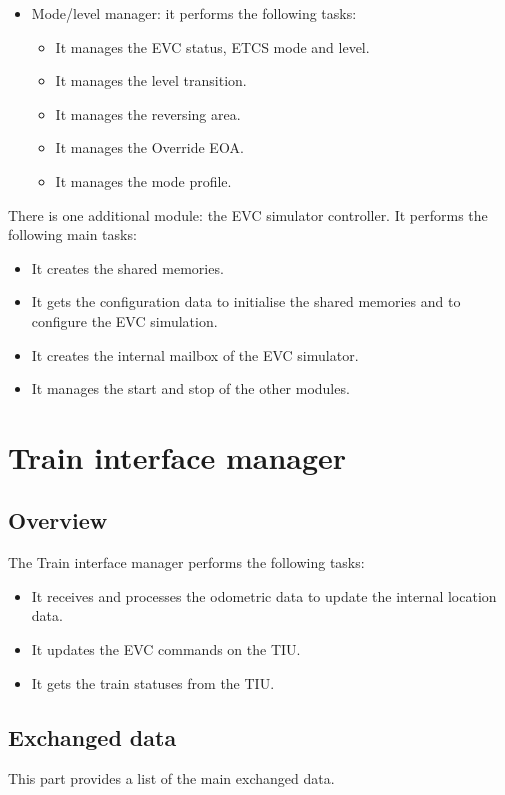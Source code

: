 \documentclass[nocc]{template/openetcs_report}
\begin{document}
\begin{itemize}
\begin{itemize}
	\end{itemize}
\item	Mode/level manager: it performs the following tasks:
	\begin{itemize}
	\item	It manages the EVC status, ETCS mode and level.
	\item	It manages the level transition.
	\item	It manages the reversing area.
	\item	It manages the Override EOA.
	\item	It manages the mode profile.
	\end{itemize}
\end{itemize}

There is one additional module: the EVC simulator controller. It performs the following main tasks:
\begin{itemize}
\item It creates the shared memories.
\item It gets the configuration data to initialise the shared memories and to configure the EVC simulation.
\item It creates the internal mailbox of the EVC simulator.
\item It manages the start and stop of the other modules.
\end{itemize}
\chapter{Train interface manager}
\section{Overview}
The Train interface manager performs the following tasks:
\begin{itemize}
\item	It receives and processes the odometric data to update the internal location data.
\item	It updates the EVC commands on the TIU.
\item	It gets the train statuses from the TIU.
\end{itemize}
\section{Exchanged data}
This part provides a list of the main exchanged data. 
\end{document}
